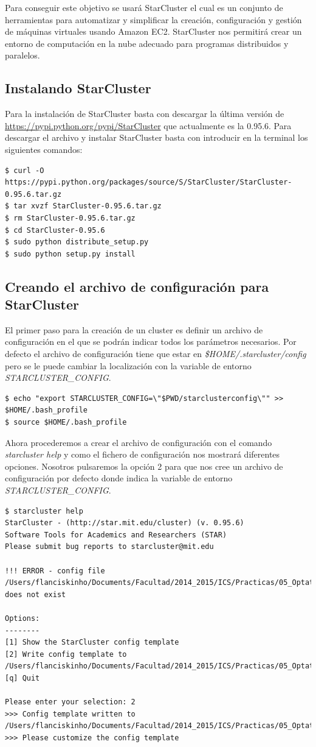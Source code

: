 \documentclass{article}
\begin{document}
	Para conseguir este objetivo se usará StarCluster el cual es un conjunto de herramientas para automatizar y simplificar la creación, configuración y gestión de máquinas virtuales usando Amazon EC2. StarCluster nos permitirá crear un entorno de computación en la nube adecuado para programas distribuidos y paralelos.
	
\subsection{Instalando StarCluster}
	Para la instalación de StarCluster basta con descargar la última versión de \url{https://pypi.python.org/pypi/StarCluster} que actualmente es la 0.95.6. Para descargar el archivo y instalar StarCluster basta con introducir en la terminal los siguientes comandos:
\begin{lstlisting}[style=minibash]
$ curl -O https://pypi.python.org/packages/source/S/StarCluster/StarCluster-0.95.6.tar.gz
$ tar xvzf StarCluster-0.95.6.tar.gz
$ rm StarCluster-0.95.6.tar.gz
$ cd StarCluster-0.95.6
$ sudo python distribute_setup.py
$ sudo python setup.py install
\end{lstlisting}

\subsection{Creando el archivo de configuración para StarCluster}
	El primer paso para la creación de un cluster es definir un archivo de configuración en el que se podrán indicar todos los parámetros necesarios. Por defecto el archivo de configuración tiene que estar en \emph{\$HOME/.starcluster/config} pero se le puede cambiar la localización con la variable de entorno \emph{STARCLUSTER\_CONFIG}.
\begin{lstlisting}[style=minibash]
$ echo "export STARCLUSTER_CONFIG=\"$PWD/starclusterconfig\"" >> $HOME/.bash_profile 
$ source $HOME/.bash_profile
\end{lstlisting}

Ahora procederemos a crear el archivo de configuración con el comando \emph{starcluster help} y como el fichero de configuración nos mostrará diferentes opciones. Nosotros pulsaremos la opción 2 para que nos cree un archivo de configuración por defecto donde indica la variable de entorno \emph{STARCLUSTER\_CONFIG}.
\begin{lstlisting}[style=minibash]
$ starcluster help
StarCluster - (http://star.mit.edu/cluster) (v. 0.95.6)
Software Tools for Academics and Researchers (STAR)
Please submit bug reports to starcluster@mit.edu

!!! ERROR - config file /Users/flanciskinho/Documents/Facultad/2014_2015/ICS/Practicas/05_Optativa/starclusterconfig does not exist

Options:
--------
[1] Show the StarCluster config template
[2] Write config template to /Users/flanciskinho/Documents/Facultad/2014_2015/ICS/Practicas/05_Optativa/starclusterconfig
[q] Quit

Please enter your selection: 2
>>> Config template written to /Users/flanciskinho/Documents/Facultad/2014_2015/ICS/Practicas/05_Optativa/starclusterconfig
>>> Please customize the config template
\end{lstlisting} 
\end{document}
